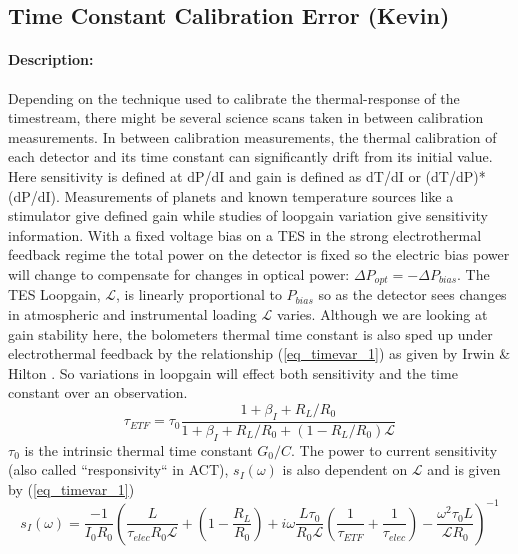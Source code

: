 \subsection{Time Constant Calibration Error (Kevin)}

\paragraph{Description:}

Depending on the technique used to calibrate the thermal-response of the timestream, there might be several science scans taken in between calibration measurements. In between calibration measurements, the thermal calibration of each detector and its time constant can significantly drift from its initial value. Here sensitivity is defined at dP/dI and gain is defined as dT/dI or (dT/dP)*(dP/dI). Measurements of planets and known temperature sources like a stimulator give defined gain while studies of loopgain variation give sensitivity information. With a fixed voltage bias on a TES in the strong electrothermal feedback regime the total power on the detector is fixed so the electric bias power will change to compensate for changes in optical power: $\Delta P_{opt}=-\Delta P_{bias}$. The TES Loopgain, $\mathcal{L}$, is linearly proportional to $P_{bias}$ so as the detector sees changes in atmospheric and instrumental loading $\mathcal{L}$ varies. Although we are looking at gain stability here, the bolometers thermal time constant is also sped up under electrothermal feedback by the relationship (\ref{eq_timevar_1}) as given by Irwin \& Hilton \cite{Irwin_Hilton}. So variations in loopgain will effect both sensitivity and the time constant over an observation.
\begin{equation}
\label{eq_timevar_1}
\tau_{ETF}=\tau_0\frac{1+\beta_I+R_L/R_0}{1+\beta_I+R_L/R_0+(1-R_L/R_0)\mathcal{L}}
\end{equation}
$\tau_0$ is the intrinsic thermal time constant $G_0/C$. The power to current sensitivity (also called ``responsivity`` in ACT), $s_I(\omega)$ is also dependent on $\mathcal{L}$ and is given by (\ref{eq_timevar_1})
\begin{equation}
\label{eq_timevar_2}
s_I(\omega)=\frac{-1}{I_0R_0}\left(\frac{L}{\tau_{elec}R_0\mathcal{L}}+(1-\frac{R_L}{R_0})+i\omega\frac{L\tau_0}{R_0\mathcal{L}}(\frac{1}{\tau_{ETF}}+\frac{1}{\tau_{elec}})-\frac{\omega^2\tau_0L}{\mathcal{L}R_0}\right)^{-1}
\end{equation}
